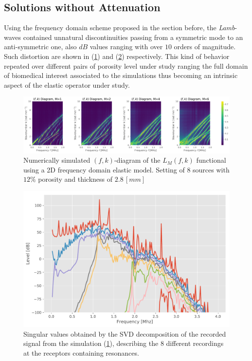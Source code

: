 \subsection{Solutions without Attenuation}
Using the frequency domain scheme proposed in the section before, the \textit{Lamb}-waves contained unnatural discontinuities passing from a symmetric mode to an anti-symmetric one, also $dB$ values ranging with over $10$ orders of magnitude. Such distortion are shown in (\ref{FK-Freq-DiagramS8P12M28}) and (\ref{SVD-Freq-S8P12M28}) respectively. This kind of behavior repeated over different pairs of porosity level under study ranging the full domain of biomedical interest associated to the simulations thus becoming an intrinsic aspect of the elastic operator under study.

\begin{figure}[!h]
	\centering
	\includegraphics[width=\textwidth]{images/FreqRes/2DFreqS8P12ElasticFK28M400_y.pdf}
	\caption{Numerically simulated $(f,k)$-diagram of the $L_M(f,k)$ functional using a 2D frequency domain elastic model. Setting of 8 sources with $12\%$ porosity and thickness of $2.8 \,[mm]$}
	\label{FK-Freq-DiagramS8P12M28}
\end{figure} 

\begin{figure}[!h]
	\centering
	\includegraphics[scale=.5]{images/FreqRes/2DFreqS812Elastic28_SV.pdf}
	\caption{Singular values obtained by the SVD decomposition of the recorded signal from the simulation (\ref{FK-Freq-DiagramS8P12M28}), describing the 8 different recordings at the receptors containing resonances.}
	\label{SVD-Freq-S8P12M28}
\end{figure}


